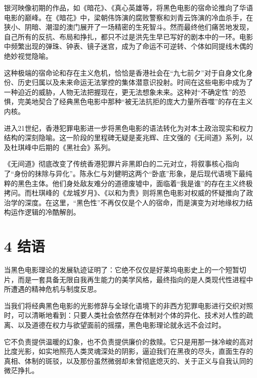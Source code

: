 \documentclass[11pt]{article}
\begin{document}
银河映像初期的作品，如《暗花》、《真心英雄等，将黑色电影的宿命论推向了华语电影的巅峰。在《暗花》中，梁朝伟饰演的腐败警察和刘青云饰演的冷血杀手，在狭小、阴暗、潮湿的澳门展开了一场精密的生死智斗。然而最终他们痛苦地发现，自己所有的反抗、布局和挣扎，都只不过是洪先生早已写好的剧本中的一环。电影中频繁出现的弹珠、钟表、镜子迷宫，成为了命运不可逆转、个体如同提线木偶的绝妙视觉隐喻。

这种极端的宿命论和存在主义危机，恰恰是香港社会在“九七前夕”对于自身文化身份、历史归属以及未来命运无法掌控的集体潜意识投射。时间在这些电影中成为了一种迫近的威胁，人物无法把握现在，更无法想象未来。这种对“不确定性”的恐惧，完美地契合了经典黑色电影中那种“被无法抗拒的庞大力量所吞噬”的存在主义内核。

进入21世纪，香港犯罪电影进一步将黑色电影的语法转化为对本土政治现实和权力结构的深刻隐喻。这一阶段的里程碑无疑是麦兆辉、庄文强的《无间道》系列，以及杜琪峰中后期的《黑社会》系列。

《无间道》彻底改变了传统香港犯罪片非黑即白的二元对立，将叙事核心指向了“身份的抹除与异化”。陈永仁与刘健明这两个“卧底”形象，是后现代语境下最纯粹的黑色主体。他们身处敌友难分的道德废墟中，面临着“我是谁”的存在主义终极拷问。而杜琪峰的《龙城岁月》、《以和为贵》则将黑色电影对权威的怀疑推向了政治学的深度。在这里，“黑色性”不再仅仅是个人的宿命，而是演变为对地缘权力结构运作逻辑的冷酷解剖。

\section{4 结语}

当黑色电影理论的发展轨迹证明了：它绝不仅仅是好莱坞电影史上的一个短暂切片，而是一套具备无限自我再生能力的美学风格，最终指向的是人类现代性进程中所遭遇的精神危机与制度反思。

当我们将经典黑色电影的光影修辞与全球化语境下的非西方犯罪电影进行交织对照时，可以清晰地看到：只要人类社会依然存在体制对个体的异化、技术对人性的疏离、以及道德在权力与欲望面前的摇摆，黑色电影理论就永远不会过时。

它不负责提供温暖的幻象，也不负责提供廉价的救赎。它只是用那一抹冷峻的高对比度光影，如实地照亮人类灵魂深处的阴影，逼迫我们在黑夜的尽头，直面生存的真相、体制的斑驳，以及那份虽然微弱却未曾彻底熄灭的、关于正义与自我认同的微茫挣扎。
\end{document}
